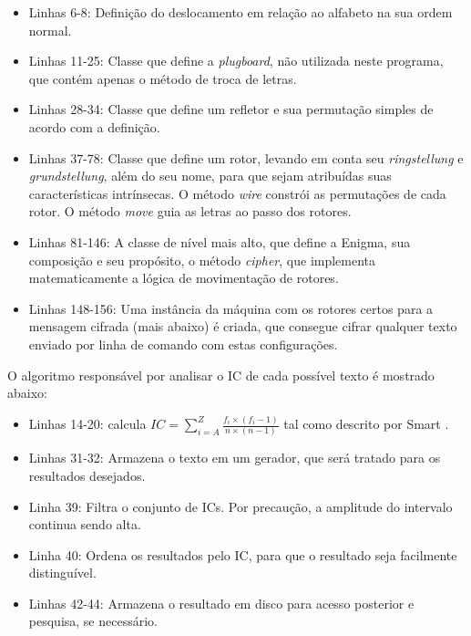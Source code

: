 \documentclass{article}
\begin{document}


\begin{itemize}

    \item Linhas 6-8: Definição do deslocamento em relação ao alfabeto na sua
        ordem normal.

    \item Linhas 11-25: Classe que define a \textit{plugboard}, não utilizada
        neste programa, que contém apenas o método de troca de letras.

    \item Linhas 28-34: Classe que define um refletor e sua permutação simples
        de acordo com a definição.

    \item Linhas 37-78: Classe que define um rotor, levando em conta seu
        \textit{ringstellung} e \textit{grundstellung}, além do seu nome, para
        que sejam atribuídas suas características intrínsecas. O método
        \textit{wire} constrói as permutações de cada rotor. O método
        \textit{move} guia as letras ao passo dos rotores.

    \item Linhas 81-146: A classe de nível mais alto, que define a Enigma, sua
        composição e seu propósito, o método \textit{cipher}, que implementa
        matematicamente a lógica de movimentação de rotores.

    \item Linhas 148-156: Uma instância da máquina com os rotores certos para
        a mensagem cifrada (mais abaixo) é criada, que consegue cifrar
        qualquer texto enviado por linha de comando com estas configurações.

\end{itemize}

O algoritmo responsável por analisar o IC de cada possível texto é mostrado
abaixo:



\begin{itemize}

    \item Linhas 14-20: calcula
        $IC = \sum_{i=A}^Z \frac{f_i \times (f_i - 1)}{n \times (n - 1)}$ tal
        como descrito por Smart \cite[p. 73]{Smart:2004:CI:1206247}.

    \item Linhas 31-32: Armazena o texto em um gerador, que será tratado para
        os resultados desejados.

    \item Linha 39: Filtra o conjunto de ICs. Por precaução, a amplitude do
        intervalo continua sendo alta.

    \item Linha 40: Ordena os resultados pelo IC, para que o resultado seja
        facilmente distinguível.

    \item Linhas 42-44: Armazena o resultado em disco para acesso posterior e
        pesquisa, se necessário.

\end{itemize}
\end{document}
